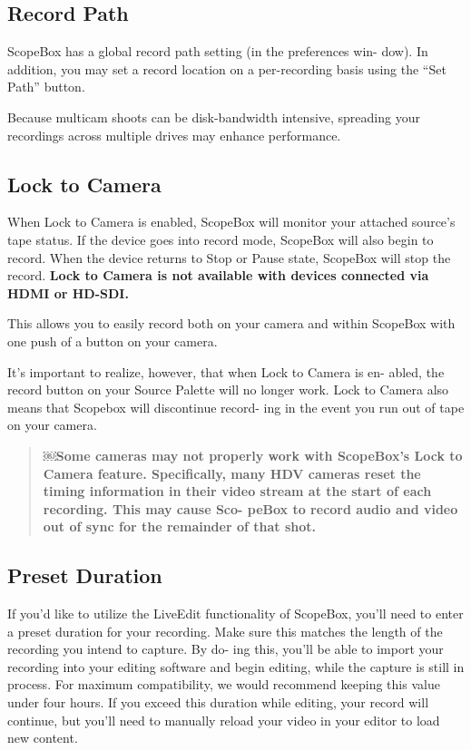 \documentclass[10,letterpaper,]{report}
\begin{document}
\subsection{Record Path}

ScopeBox has a global record path setting (in the preferences win- dow).
In addition, you may set a record location on a per-recording basis
using the ``Set Path'' button.

Because multicam shoots can be disk-bandwidth intensive, spreading your
recordings across multiple drives may enhance performance.

\subsection{Lock to Camera}

When Lock to Camera is enabled, ScopeBox will monitor your attached
source's tape status. If the device goes into record mode, ScopeBox will
also begin to record. When the device returns to Stop or Pause state,
ScopeBox will stop the record. \textbf{Lock to Camera is not available
with devices connected via HDMI or HD-SDI.}

This allows you to easily record both on your camera and within ScopeBox
with one push of a button on your camera.

It's important to realize, however, that when Lock to Camera is en-
abled, the record button on your Source Palette will no longer work.
Lock to Camera also means that Scopebox will discontinue record- ing in
the event you run out of tape on your camera.

\begin{quote}
\textbf{￼Some cameras may not properly work with ScopeBox's Lock to
Camera feature. Specifically, many HDV cameras reset the timing
information in their video stream at the start of each recording. This
may cause Sco- peBox to record audio and video out of sync for the
remainder of that shot.}
\end{quote}

\subsection{Preset Duration}

If you'd like to utilize the LiveEdit functionality of ScopeBox, you'll
need to enter a preset duration for your recording. Make sure this
matches the length of the recording you intend to capture. By do- ing
this, you'll be able to import your recording into your editing software
and begin editing, while the capture is still in process. For maximum
compatibility, we would recommend keeping this value under four hours.
If you exceed this duration while editing, your record will continue,
but you'll need to manually reload your video in your editor to load new
content.
\end{document}
